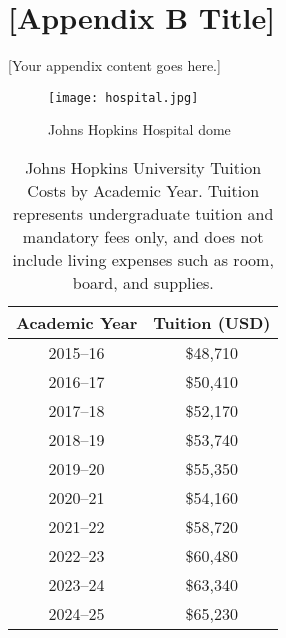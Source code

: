\chapter{[Appendix B Title]}
\label{app:appendixB}

[Your appendix content goes here.]

\begin{figure}[ht]
    \centering
    \texttt{[image: hospital.jpg]}
    \caption{Johns Hopkins Hospital dome}
    \label{fig:hospital}
\end{figure}

\begin{table}[ht]
\centering
\caption[Johns Hopkins University Tuition Costs by Academic Year]{Johns Hopkins University Tuition Costs by Academic Year. Tuition represents undergraduate tuition and mandatory fees only, and does not include living expenses such as room, board, and supplies.}
\label{tab:jhu_tuition}
\begin{tabular}{|c|c|}
\hline
\textbf{Academic Year} & \textbf{Tuition (USD)} \\
\hline
2015–16 & \$48,710 \\
2016–17 & \$50,410 \\
2017–18 & \$52,170 \\
2018–19 & \$53,740 \\
2019–20 & \$55,350 \\
2020–21 & \$54,160 \\
2021–22 & \$58,720 \\
2022–23 & \$60,480 \\
2023–24 & \$63,340 \\
2024–25 & \$65,230 \\
\hline
\end{tabular}
\end{table}

